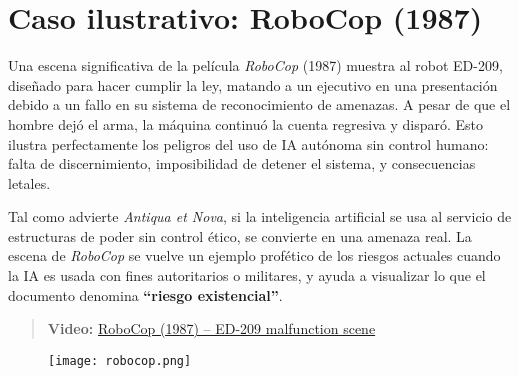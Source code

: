 \documentclass[12pt]{article}
\begin{document}
\section*{Caso ilustrativo: RoboCop (1987)}

Una escena significativa de la película \textit{RoboCop} (1987) muestra al robot ED-209, diseñado para hacer cumplir la ley, matando a un ejecutivo en una presentación debido a un fallo en su sistema de reconocimiento de amenazas. A pesar de que el hombre dejó el arma, la máquina continuó la cuenta regresiva y disparó. Esto ilustra perfectamente los peligros del uso de IA autónoma sin control humano: falta de discernimiento, imposibilidad de detener el sistema, y consecuencias letales.

Tal como advierte \textit{Antiqua et Nova}, si la inteligencia artificial se usa al servicio de estructuras de poder sin control ético, se convierte en una amenaza real. La escena de \textit{RoboCop} se vuelve un ejemplo profético de los riesgos actuales cuando la IA es usada con fines autoritarios o militares, y ayuda a visualizar lo que el documento denomina \textbf{“riesgo existencial”}.

\newpage
\begin{quote}
\textbf{Video:} \href{https://www.youtube.com/watch?v=TYsulVXpgYg}{RoboCop (1987) -- ED-209 malfunction scene}
\end{quote}
\begin{figure}
\texttt{[image: robocop.png]}
\end{figure}
\end{document}
